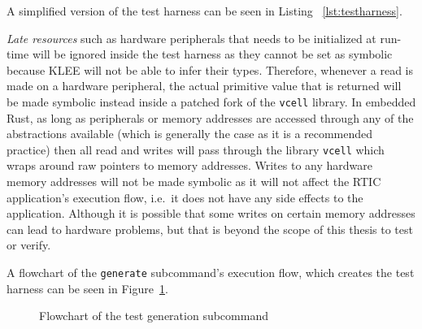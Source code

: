 A simplified version of the test harness can be seen in Listing
~\ref{lst:testharness}.



\emph{Late resources} such as hardware peripherals that needs to be initialized at
run-time will be ignored inside the test harness as they cannot be set as
symbolic because KLEE will not be able to infer their types. Therefore, whenever
a read is made on a hardware peripheral, the actual primitive value that is
returned will be made symbolic instead inside a patched fork of the
\texttt{vcell} library. In embedded Rust, as long as peripherals or memory
addresses are accessed through any of the abstractions available (which is
generally the case as it is a recommended practice) then all read and writes will pass
through the library \texttt{vcell} which wraps around raw pointers to memory
addresses. Writes to any hardware memory addresses will not be made symbolic as
it will not affect the RTIC application's execution flow, i.e.\ it does not
have any side effects to the application. Although it is possible that some
writes on certain memory addresses can lead to hardware problems, but that is
beyond the scope of this thesis to test or verify.

A flowchart of the \texttt{generate} subcommand's execution flow, which creates
the test harness can be seen in Figure~\ref{fig:generatecmd}.
\begin{figure}[H]
    \centering
    \caption{Flowchart of the test generation subcommand}
    \label{fig:generatecmd}
\end{figure}

